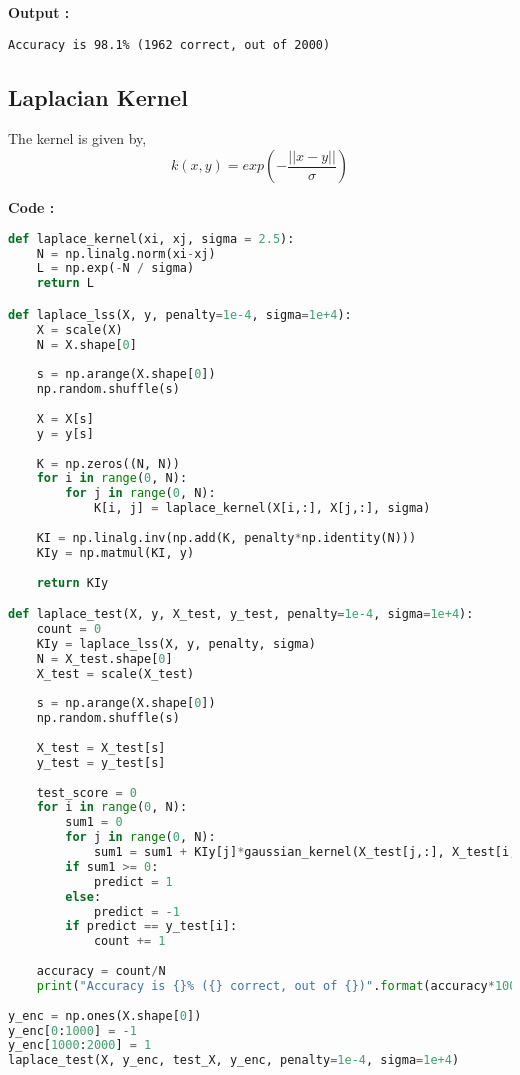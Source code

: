 \documentclass[a4paper, 11pt]{article}
\begin{document}
\textbf{Output :}
\begin{verbatim}
Accuracy is 98.1% (1962 correct, out of 2000)
\end{verbatim}

\subsection*{Laplacian Kernel}

The kernel is given by,
$$k(x,y) = exp(- \frac{||x-y||}{\sigma})$$

\textbf{Code :}
\begin{lstlisting}[language=Python]
def laplace_kernel(xi, xj, sigma = 2.5):
    N = np.linalg.norm(xi-xj)
    L = np.exp(-N / sigma)
    return L

def laplace_lss(X, y, penalty=1e-4, sigma=1e+4):
    X = scale(X)
    N = X.shape[0]
    
    s = np.arange(X.shape[0])
    np.random.shuffle(s)
    
    X = X[s]
    y = y[s]
    
    K = np.zeros((N, N))
    for i in range(0, N):
        for j in range(0, N):
            K[i, j] = laplace_kernel(X[i,:], X[j,:], sigma)
    
    KI = np.linalg.inv(np.add(K, penalty*np.identity(N)))
    KIy = np.matmul(KI, y)
    
    return KIy

def laplace_test(X, y, X_test, y_test, penalty=1e-4, sigma=1e+4):
    count = 0
    KIy = laplace_lss(X, y, penalty, sigma)
    N = X_test.shape[0]
    X_test = scale(X_test)
    
    s = np.arange(X.shape[0])
    np.random.shuffle(s)
    
    X_test = X_test[s]
    y_test = y_test[s]
    
    test_score = 0
    for i in range(0, N):
        sum1 = 0
        for j in range(0, N):
            sum1 = sum1 + KIy[j]*gaussian_kernel(X_test[j,:], X_test[i, :], sigma)
        if sum1 >= 0:
            predict = 1
        else:
            predict = -1
        if predict == y_test[i]:
            count += 1
    
    accuracy = count/N
    print("Accuracy is {}% ({} correct, out of {})".format(accuracy*100.0, count, N))
    
y_enc = np.ones(X.shape[0])
y_enc[0:1000] = -1
y_enc[1000:2000] = 1
laplace_test(X, y_enc, test_X, y_enc, penalty=1e-4, sigma=1e+4)

\end{lstlisting}
\end{document}
